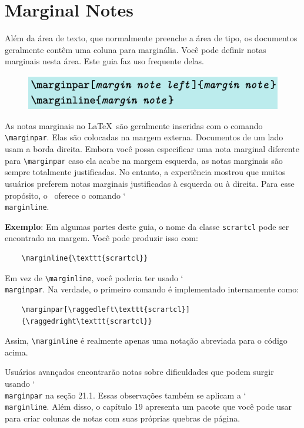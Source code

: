 \chapter{Marginal Notes}
Além da área de texto, que normalmente preenche a área de tipo, os documentos geralmente contêm uma coluna para marginália. Você pode definir notas marginais nesta área. Este guia faz uso frequente delas.

\begin{figure}[h]
    \centering
    \includegraphics[width=0.6\linewidth]{imagens/imagem25.png}
\end{figure}

As notas marginais no \LaTeX\ são geralmente inseridas com o comando \verb|\marginpar|. Elas são colocadas na margem externa. Documentos de um lado usam a borda direita. Embora você possa especificar uma nota marginal diferente para \verb|\marginpar| caso ela acabe na margem esquerda, as notas marginais são sempre totalmente justificadas. No entanto, a experiência mostrou que muitos usuários preferem notas marginais justificadas à esquerda ou à direita. Para esse propósito, o \KOMAScript\ oferece o comando \char`\\\texttt{mar\-gin\-li\-ne}.

\textbf{Exemplo}: Em algumas partes deste guia, o nome da classe \texttt{scrartcl} pode ser encontrado na margem. Você pode produzir isso com:
\begin{verbatim}
    \marginline{\texttt{scrartcl}}   
\end{verbatim}

Em vez de \verb|\marginline|, você poderia ter usado \char`\\\texttt{mar\-gin\-par}. Na verdade, o primeiro comando é implementado internamente como:
\begin{verbatim}
    \marginpar[\raggedleft\texttt{scrartcl}]
    {\raggedright\texttt{scrartcl}}
\end{verbatim}

Assim, \verb|\marginline| é realmente apenas uma notação abreviada para o código acima.

Usuários avançados encontrarão notas sobre dificuldades que podem surgir usando \char`\\\texttt{mar\-gin\-par} na seção 21.1. Essas observações também se aplicam a \char`\\\texttt{mar\-gin\-li\-ne}. Além disso, o capítulo 19 apresenta um pacote que você pode usar para criar colunas de notas com suas próprias quebras de página.
